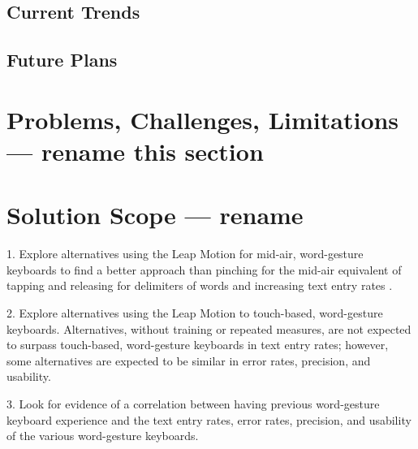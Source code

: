 \subsection{Current Trends}

\subsection{Future Plans}

\section{Problems, Challenges, Limitations --- rename this section}

\section{Solution Scope --- rename}

1.	Explore alternatives using the Leap Motion for mid-air, word-gesture keyboards to find a better approach than pinching for the mid-air equivalent of tapping and releasing for delimiters of words and increasing text entry rates \cite{ref9}.

2.	Explore alternatives using the Leap Motion to touch-based, word-gesture keyboards. Alternatives, without training or repeated measures, are not expected to surpass touch-based, word-gesture keyboards in text entry rates; however, some alternatives are expected to be similar in error rates, precision, and usability.

3.	Look for evidence of a correlation between having previous word-gesture keyboard experience and the text entry rates, error rates, precision, and usability of the various word-gesture keyboards.
